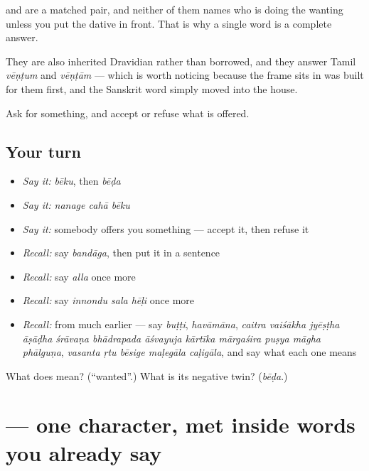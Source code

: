 \begin{grammarlens}[title={Grammar Lens: the pair, and the missing half}]
 and  are a matched pair, and neither of them names who is doing the wanting unless you put the dative in front. That is why a single word is a complete answer.

They are also inherited Dravidian rather than borrowed, and they answer Tamil \emph{vēṇṭum} and \emph{vēṇṭām} — which is worth noticing because the frame  sits in was built for them first, and the Sanskrit word simply moved into the house.
\end{grammarlens}

\begin{grammarlens}[title={What you've built}]
Ask for something, and accept or refuse what is offered.
\end{grammarlens}

\subsection*{Your turn}
\begin{itemize}
\raggedright
  \item \emph{Say it:} \emph{bēku}, then \emph{bēḍa}
  \item \emph{Say it:} \emph{nanage cahā bēku}
  \item \emph{Say it:} somebody offers you something — accept it, then refuse it
  \item \emph{Recall:} say \emph{bandāga}, then put it in a sentence
  \item \emph{Recall:} say \emph{alla} once more
  \item \emph{Recall:} say \emph{innondu sala hēḷi} once more
  \item \emph{Recall:} from much earlier — say \emph{buṭṭi}, \emph{havāmāna}, \emph{caitra vaiśākha jyēṣṭha āṣāḍha śrāvaṇa bhādrapada āśvayuja kārtīka mārgaśira puṣya māgha phālguṇa}, \emph{vasanta ṛtu bēsige maḷegāla caḷigāla}, and say what each one means
\end{itemize}

\begin{tcolorbox}[breakable,colback=teal!4,colframe=teal!35!black,title={Before you move on}]
What does  mean? (\textquotedblleft{}wanted\textquotedblright{}.) What is its negative twin? (\emph{bēḍa}.)
\end{tcolorbox}
\section[\texorpdfstring{\kn{ಜ} (ja)}{ಜ (ja)}]{ — one character, met inside words you already say}

